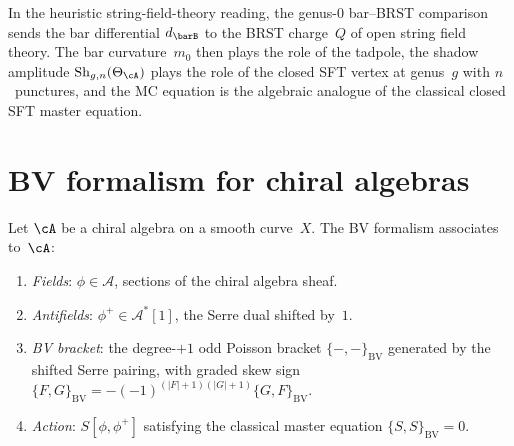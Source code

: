 \begin{remark}
\label{rem:sft-bar-identification}
In the heuristic string-field-theory reading, the genus-$0$
bar--BRST comparison sends the bar differential
$d_{\barB}$ to the BRST charge~$Q$ of open string field theory. The
bar curvature~$m_0$ then plays the role of the tadpole, the shadow
amplitude $\mathrm{Sh}_{g,n}(\Theta_\cA)$ plays the role of the
closed SFT vertex at genus~$g$ with $n$~punctures, and the MC
equation is the algebraic analogue of the classical closed SFT
master equation.
\end{remark}

\section{BV formalism for chiral algebras}

\begin{definition}
\label{def:bv-data-chiral}
Let $\cA$ be a chiral algebra on a smooth curve~$X$.
The BV formalism associates to~$\cA$:
\begin{enumerate}[label=\textup{(\roman*)}]
\item \emph{Fields}: $\phi \in \mathcal{A}$, sections of the chiral algebra sheaf.
\item \emph{Antifields}: $\phi^+ \in \mathcal{A}^*[1]$, the Serre dual shifted by~$1$.
\item \emph{BV bracket}: the degree-$+1$ odd Poisson bracket
 $\{-,-\}_{\mathrm{BV}}$ generated by the shifted Serre pairing,
 with graded skew sign
 $\{F,G\}_{\mathrm{BV}}
 = -(-1)^{(|F|+1)(|G|+1)}\{G,F\}_{\mathrm{BV}}$.
\item \emph{Action}: $S[\phi, \phi^+]$ satisfying the classical master
 equation $\{S,S\}_{\mathrm{BV}} = 0$.
\end{enumerate}
\end{definition}

